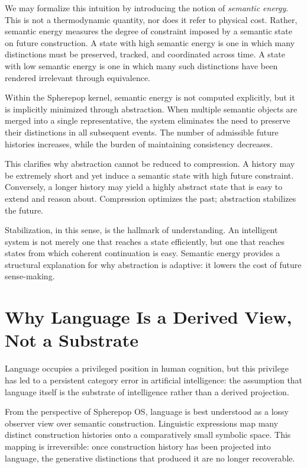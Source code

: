 \documentclass[11pt]{article}
\begin{document}
We may formalize this intuition by introducing the notion of \emph{semantic
energy}. This is not a thermodynamic quantity, nor does it refer to
physical cost. Rather, semantic energy measures the degree of constraint
imposed by a semantic state on future construction. A state with high
semantic energy is one in which many distinctions must be preserved,
tracked, and coordinated across time. A state with low semantic energy is
one in which many such distinctions have been rendered irrelevant through
equivalence.

Within the Spherepop kernel, semantic energy is not computed explicitly,
but it is implicitly minimized through abstraction. When multiple semantic
objects are merged into a single representative, the system eliminates the
need to preserve their distinctions in all subsequent events. The number
of admissible future histories increases, while the burden of maintaining
consistency decreases.

This clarifies why abstraction cannot be reduced to compression. A history
may be extremely short and yet induce a semantic state with high future
constraint. Conversely, a longer history may yield a highly abstract state
that is easy to extend and reason about. Compression optimizes the past;
abstraction stabilizes the future.

Stabilization, in this sense, is the hallmark of understanding. An
intelligent system is not merely one that reaches a state efficiently, but
one that reaches states from which coherent continuation is easy. Semantic
energy provides a structural explanation for why abstraction is adaptive:
it lowers the cost of future sense-making.

\section{Why Language Is a Derived View, Not a Substrate}

Language occupies a privileged position in human cognition, but this
privilege has led to a persistent category error in artificial
intelligence: the assumption that language itself is the substrate of
intelligence rather than a derived projection.

From the perspective of Spherepop OS, language is best understood as a
lossy observer view over semantic construction. Linguistic expressions map
many distinct construction histories onto a comparatively small symbolic
space. This mapping is irreversible: once construction history has been
projected into language, the generative distinctions that produced it are
no longer recoverable.
\end{document}

